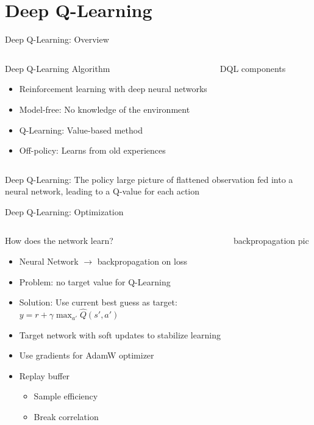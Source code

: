 \documentclass[10pt,xcolor=table, aspectratio=1610]{beamer}
\begin{document}
\section{Deep Q-Learning}
\begin{frame}{Deep Q-Learning: Overview}
    \begin{columns}
      \begin{block}{Deep Q-Learning Algorithm}
        \begin{itemize}
          \item Reinforcement learning with deep neural networks
          \item Model-free: No knowledge of the environment
          \item Q-Learning: Value-based method
          \item Off-policy: Learns from old experiences
        \end{itemize}
      \end{block}
      DQL components
    \end{columns}
\end{frame}
\begin{frame}{Deep Q-Learning: The policy}
    large picture of flattened observation fed into a neural network, leading to a Q-value for each action
\end{frame}
\begin{frame}{Deep Q-Learning: Optimization}
    \begin{columns}
      \begin{block}{How does the network learn?}
        \begin{itemize}
          \item Neural Network $\rightarrow$ backpropagation on loss
          \item Problem: no target value for Q-Learning
          \item Solution: Use current best guess as target: \\
                $y = r + \gamma \max_{a'} \hat{Q}(s', a')$
          \item Target network with soft updates to stabilize learning
          \item Use gradients for AdamW optimizer
          \item Replay buffer
                \begin{itemize}
                  \item Sample efficiency
                  \item Break correlation
                \end{itemize}
        \end{itemize}
      \end{block}
      backpropagation pic
    \end{columns}
\end{frame}
\end{document}
